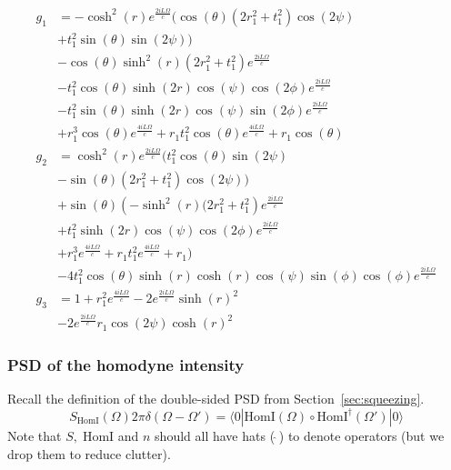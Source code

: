 \documentclass[aps,pra,superscriptaddress,reprint,nofootinbib]{revtex4-1}
\begin{document}
\begingroup
\allowdisplaybreaks
\begin{align}
g_1 &= -\cosh ^2(r) e^{\frac{2 i L \Omega }{c}} (\cos (\theta ) \left(2 r_1^2+t_1^2\right) \cos (2 \psi )\\
	&+t_1^2	\sin (\theta ) \sin (2 \psi )) \nonumber\\
	&-\cos (\theta ) \sinh ^2(r) \left(2 r_1^2+t_1^2\right) e^{\frac{2 i L \Omega
	}{c}}\nonumber\\
	&-t_1^2 \cos (\theta ) \sinh (2 r) \cos (\psi ) \cos (2 \phi ) e^{\frac{2 i L \Omega }{c}}\nonumber\\
	&-t_1^2 \sin (\theta )
	\sinh (2 r) \cos (\psi ) \sin (2 \phi ) e^{\frac{2 i L \Omega }{c}}\nonumber\\
	&+r_1^3 \cos (\theta ) e^{\frac{4 i L \Omega
	}{c}}+r_1 t_1^2 \cos (\theta ) e^{\frac{4 i L \Omega }{c}}+r_1 \cos (\theta ) \nonumber\\
g_2 &= \cosh ^2(r) e^{\frac{2 i L \Omega }{c}} (t_1^2 \cos (\theta ) \sin (2 \psi )\\
	&-\sin (\theta ) \left(2 r_1^2+t_1^2\right) \cos (2 \psi ))\nonumber\\
	&+\sin (\theta ) \left(-\sinh ^2(r) (2 r_1^2+t_1^2\right)
	e^{\frac{2 i L \Omega }{c}}\nonumber\\
	&+t_1^2 \sinh (2 r) \cos (\psi ) \cos (2 \phi ) e^{\frac{2 i L \Omega }{c}}\nonumber\\
	&+r_1^3	e^{\frac{4 i L \Omega }{c}}+r_1 t_1^2 e^{\frac{4 i L \Omega }{c}}+r_1)\nonumber\\
	&-4 t_1^2 \cos (\theta ) \sinh (r) \cosh (r) \cos (\psi ) \sin (\phi ) \cos (\phi ) e^{\frac{2 i L \Omega }{c}} \nonumber\\
g_3 &= 1 + r_1^2 e^{\frac{4 i L \Omega}{c}} - 2 e^{\frac{2 i L \Omega}{c}} \sinh(r)^2 \\
	&- 2 e^{\frac{2 i L \Omega}{c}} r_1 \cos(2 \psi) \cosh(r)^2 \nonumber
\end{align}
\endgroup

\subsubsection{PSD of the homodyne intensity}

Recall the definition of the double-sided PSD from Section~\ref{sec:squeezing}.
\begin{equation}
S_\mathrm{HomI}(\Omega) 2 \pi \delta(\Omega - \Omega') = \langle0| \mathrm{HomI}(\Omega) \circ \mathrm{HomI}^\dagger(\Omega') |0\rangle
\end{equation}
Note that $S,\; \mathrm{HomI}$ and $n$ should all have hats (\,$\hat{}$\,) to denote operators (but we drop them to reduce clutter).
\end{document}
